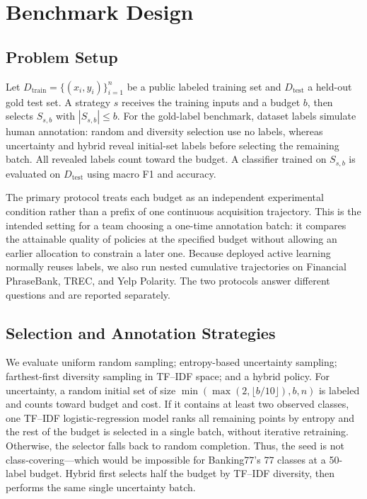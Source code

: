 \documentclass[conference]{IEEEtran}
\begin{document}
\section{Benchmark Design}

\subsection{Problem Setup}
Let $D_{\mathrm{train}}=\{(x_i,y_i)\}_{i=1}^{n}$ be a public labeled training set and $D_{\mathrm{test}}$ a held-out gold test set. A strategy $s$ receives the training inputs and a budget $b$, then selects $S_{s,b}$ with $|S_{s,b}|\le b$. For the gold-label benchmark, dataset labels simulate human annotation: random and diversity selection use no labels, whereas uncertainty and hybrid reveal initial-set labels before selecting the remaining batch. All revealed labels count toward the budget. A classifier trained on $S_{s,b}$ is evaluated on $D_{\mathrm{test}}$ using macro F1 and accuracy.

The primary protocol treats each budget as an independent experimental condition rather than a prefix of one continuous acquisition trajectory. This is the intended setting for a team choosing a one-time annotation batch: it compares the attainable quality of policies at the specified budget without allowing an earlier allocation to constrain a later one. Because deployed active learning normally reuses labels, we also run nested cumulative trajectories on Financial PhraseBank, TREC, and Yelp Polarity. The two protocols answer different questions and are reported separately.

\subsection{Selection and Annotation Strategies}
We evaluate uniform random sampling; entropy-based uncertainty sampling; farthest-first diversity sampling in TF--IDF space; and a hybrid policy. For uncertainty, a random initial set of size $\min(\max(2,\lfloor b/10\rfloor),b,n)$ is labeled and counts toward budget and cost. If it contains at least two observed classes, one TF--IDF logistic-regression model ranks all remaining points by entropy and the rest of the budget is selected in a single batch, without iterative retraining. Otherwise, the selector falls back to random completion. Thus, the seed is not class-covering---which would be impossible for Banking77's 77 classes at a 50-label budget. Hybrid first selects half the budget by TF--IDF diversity, then performs the same single uncertainty batch.
\end{document}
